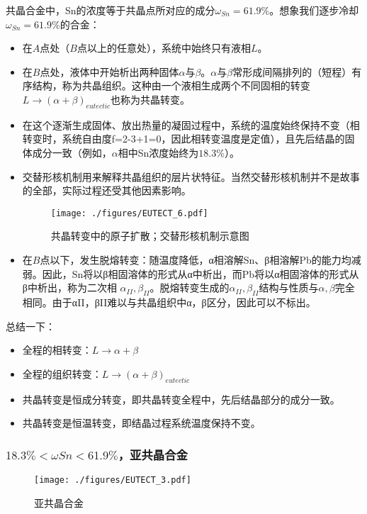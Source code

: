 共晶合金中，Sn的浓度等于共晶点所对应的成分$\omega_{Sn}=61.9\%$。想象我们逐步冷却$\omega_{Sn}=61.9\%$的合金：
\begin{itemize}
\item 在$A$点处（$B$点以上的任意处），系统中始终只有液相$L$。
\item 在$B$点处，液体中开始析出两种固体$\alpha$与$\beta$。$\alpha$与$\beta$常形成间隔排列的（短程）有序结构，称为共晶组织。这种由一个液相生成两个不同固相的转变$L\to(\alpha+\beta)_{eutectic}$也称为共晶转变。
\item 在这个逐渐生成固体、放出热量的凝固过程中，系统的温度始终保持不变（相转变时，系统自由度f=2-3+1=0，因此相转变温度是定值），且先后结晶的固体成分一致（例如，$\alpha$相中Sn浓度始终为$18.3\%$）。
\item 交替形核机制用来解释共晶组织的层片状特征。当然交替形核机制并不是故事的全部，实际过程还受其他因素影响。
\begin{figure}[ht]
\centering
\texttt{[image: ./figures/EUTECT\_6.pdf]}
\caption{共晶转变中的原子扩散；交替形核机制示意图} \label{EUTECT_fig6}
\end{figure}
\item 在$B$点以下，发生脱熔转变：随温度降低，α相溶解Sn、β相溶解Pb的能力均减弱。因此，Sn将以β相固溶体的形式从α中析出，而Pb将以α相固溶体的形式从β中析出，称为二次相 $\alpha_{II},\beta_{II} $。脱熔转变生成的$\alpha_{II},\beta_{II} $结构与性质与$\alpha, \beta$完全相同。由于αII，βII难以与共晶组织中α，β区分，因此可以不标出。
\end{itemize}

总结一下：
\begin{itemize}
\item 全程的相转变：$L \rightarrow \alpha+\beta$
\item 全程的组织转变：$L \rightarrow (\alpha+\beta)_{eutectic}$
\item 共晶转变是恒成分转变，即共晶转变全程中，先后结晶部分的成分一致。
\item 共晶转变是恒温转变，即结晶过程系统温度保持不变。
\end{itemize}

\subsubsection{$18.3\%<\omega Sn<61.9\%$，亚共晶合金}
\begin{figure}[ht]
\centering
\texttt{[image: ./figures/EUTECT\_3.pdf]}
\caption{亚共晶合金} \label{EUTECT_fig3}
\end{figure}

